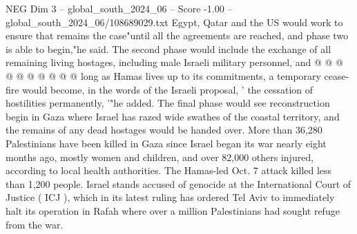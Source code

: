 \begin{textsample}{NEG Dim 3 – global\_south\_2024\_06 – Score -1.00 – global\_south\_2024\_06/108689029.txt}
Egypt, Qatar and the US would work to ensure that remains the case"until all the agreements are reached, and phase two is able to begin,"he said.
The second phase would include the exchange of all remaining living hostages, including male Israeli military personnel, and @ @ @ @ @ @ @ @ @ @ long as Hamas lives up to its commitments, a temporary cease-fire would become, in the words of the Israeli proposal, ' the cessation of hostilities permanently, '"he added.
The final phase would see reconstruction begin in Gaza where Israel has razed wide swathes of the coastal territory, and the remains of any dead hostages would be handed over.
More than 36,280 Palestinians have been killed in Gaza since Israel began its war nearly eight months ago, mostly women and children, and over 82,000 others injured, according to local health authorities.
The Hamas-led Oct. 7 attack killed less than 1,200 people.
Israel stands accused of genocide at the International Court of Justice ( ICJ ), which in its latest ruling has ordered Tel Aviv to immediately halt its operation in Rafah where over a million Palestinians had sought refuge from the war.

\end{textsample}

